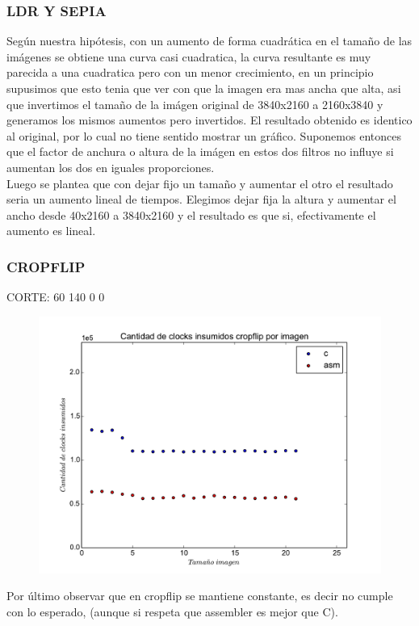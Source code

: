 \subsubsection*{LDR Y SEPIA}  

Según nuestra hipótesis, con un aumento de forma cuadrática en el tamaño de las imágenes se obtiene una curva casi cuadratica, la curva resultante es muy parecida a una cuadratica pero con un menor crecimiento, en un principio supusimos que esto tenia que ver con que la imagen era mas ancha que alta, asi que invertimos el tamaño de la imágen original de 3840x2160 a 2160x3840 y generamos los mismos aumentos pero invertidos. El resultado obtenido es identico al original, por lo cual no tiene sentido mostrar un gráfico. Suponemos entonces que el factor de anchura o altura de la imágen en estos dos filtros no influye si aumentan los dos en iguales proporciones. \\

Luego se plantea que con dejar fijo un tamaño y aumentar el otro el resultado seria un aumento lineal de tiempos. Elegimos dejar fija la altura y aumentar el ancho desde 40x2160 a 3840x2160 y el resultado es que si, efectivamente el aumento es lineal. \\

\subsubsection*{CROPFLIP}

CORTE: 60 140 0 0 

\begin{figure}
  \begin{center}
	\includegraphics[scale=0.5]{cropflipall.pdf}
  \end{center}
\end{figure}


Por último observar que en cropflip se mantiene constante, es decir no cumple con lo esperado, (aunque si respeta que assembler es mejor que C). \\
\newpage
